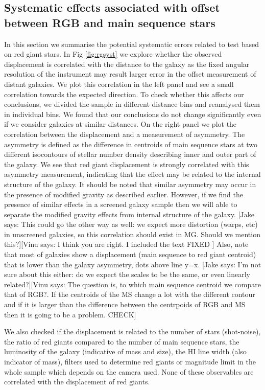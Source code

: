 \documentclass[useAMS,usenatbib,twocolumn]{mn2e}
\newcommand{\jakesays}[1]{{\color{red}[Jake says: #1]}}
\newcommand{\vinusays}[1]{{\color{blue}[Vinu says: #1]}}
\begin{document}
\subsection{Systematic effects associated with offset between RGB and main
sequence stars}
\label{ap:rgb-systematics}
In this section we summarise the potential systematic errors related to test
based on red giant stars.
In Fig \ref{fig:rgsyst} we explore whether the observed displacement
is correlated with the distance to the galaxy as the fixed angular resolution
of the instrument may result larger error in the offset measurement of distant
galaxies. We plot this correlation in the left panel and see a small
correlation towards the expected direction. To check whether this affects
our conclusions, we divided the sample in different distance bins and
reanalysed them in individual bins. We found that our conclusions do not change
significantly even if we consider galaxies at similar distances.
On the right panel we plot the correlation between the
displacement and a measurement of asymmetry. The asymmetry is defined as the
difference in centroids of main sequence stars at two different isocontours of
stellar number density describing inner and outer part of
the galaxy. We see that red giant displacement is strongly correlated with
this asymmetry measurement, indicating that the effect may be related
to the internal structure of the galaxy. It should be noted that
similar asymmetry may occur in the presence of modified gravity as described
earlier. However, if we find the presence of similar effects in a screened
galaxy sample then we will able to separate the modified gravity effects from
internal structure of the galaxy. \jakesays{This could go the other
way as well: we expect more distortion (warps, etc) in unscreened galaxies,
so this correlation should exist in MG.  Should we mention this?}\vinusays{I
think you are right. I included the text FIXED } Also,
note that most of galaxies show a displacement (main sequence to red giant
centroid) that is lower than the galaxy asymmetry, dots above line y=x.
\jakesays{I'm not sure about this either: do we expect the scales to be
the same, or even linearly related?}\vinusays{The question is, to which
main sequence centroid we compare that of RGB?. If the centroids of the MS
change a lot with the different contour and if it is larger than the difference
between the centrpoids of RGB and MS then it is going to be a problem. CHECK}


We also checked if the displacement is related to the number of stars
(shot-noise), the ratio of red giants compared to the number of main sequence
stars,
the luminosity of the galaxy (indicative of mass and size),  the HI line
width (also indicator of mass), filters used to determine red giants or
magnitude limit in the whole sample which depends on the
camera used. None of these observables are correlated with the
displacement of red giants.
\end{document}
